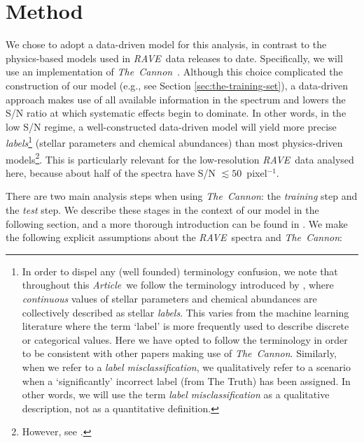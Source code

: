 \documentclass[preprint]{aastex61}
\newcommand{\acronym}[1]{{\small{#1}}}
\newcommand{\article}{\emph{Article}}
\newcommand{\project}[1]{\textsl{#1}}
\newcommand{\thecannon}{\project{The~Cannon}}
\newcommand{\rave}{\project{\acronym{RAVE}}}
\begin{document}
\section{Method}
\label{sec:method}


We chose to adopt a data-driven model for this analysis, in contrast to the
physics-based models used in \rave\ data releases to date.  Specifically, we will
use an implementation of \thecannon\ \citep{Ness_2015,Ness_2016}.  Although this 
choice complicated the construction of our model (e.g., see Section 
\ref{sec:the-training-set}), a data-driven approach makes use of all available 
information in the spectrum and lowers the S/N ratio at which systematic effects 
begin to dominate.  In other words, in the low S/N regime, a well-constructed 
data-driven model will yield more precise \emph{labels}\footnote{In order to 
dispel any (well founded) terminology confusion, we note that throughout this
\article\ we follow the terminology introduced by \citet{Ness_2015}, where 
\emph{continuous} values of stellar parameters and chemical abundances are 
collectively described as stellar \emph{labels}. This varies from the machine 
learning literature where the term `label' is more frequently used to describe
discrete or categorical values. Here we have opted to follow the \citet{Ness_2015} 
terminology in order to be consistent with other papers making use of \thecannon.
Similarly, when we refer to a \emph{label misclassification}, we qualitatively
refer to a scenario when a `significantly' incorrect label (from The Truth) has
been assigned. In other words, we will use the term \emph{label misclassification}
as a qualitative description, not as a quantitative definition.}
(stellar parameters and chemical abundances) than most physics-driven 
models\footnote{However, see \citet{Casey_2016a}.}.  This is particularly relevant 
for the low-resolution \rave\ data analysed here, because about half of the 
spectra have S/N $\lesssim 50$~pixel$^{-1}$.


There are two main analysis steps when using \thecannon: the \emph{training} 
step and the \emph{test} step.  We describe these stages in the context of our
model in the following section, and a more thorough introduction can be found
in \citet{Ness_2015}.  We make the following explicit assumptions about the 
\rave\ spectra and \thecannon:
\end{document}
